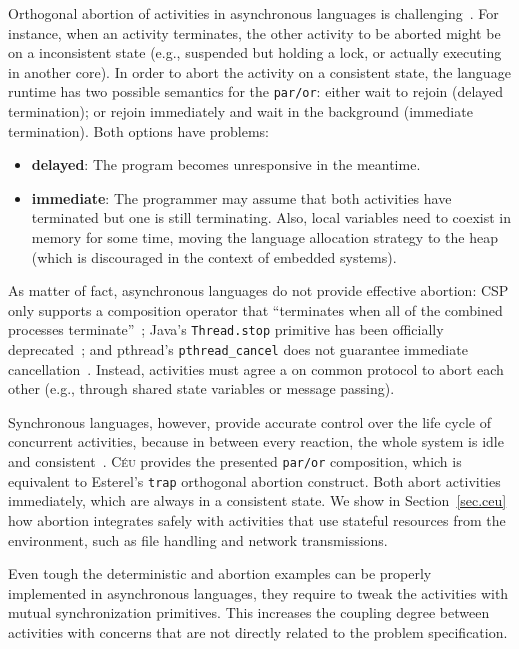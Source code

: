 \documentclass{acm_proc_article-sp}
\newcommand{\CEU}{\textsc{C\'{e}u}\xspace}
\newcommand{\code}[1] {{\small{\texttt{#1}}}}
\newcommand{\1}{\;}
\newcommand{\2}{\;\;}
\newcommand{\3}{\;\;\;}
\newcommand{\5}{\;\;\;\;\;}
\begin{document}
Orthogonal abortion of activities in asynchronous languages is 
challenging~\cite{esterel.preemption}.
%
For instance, when an activity terminates, the other activity to be aborted 
might be on a inconsistent state (e.g., suspended but holding a lock, or 
actually executing in another core).
%
In order to abort the activity on a consistent state, the language runtime has 
two possible semantics for the \code{par/or}:
either wait to rejoin (delayed termination);
or rejoin immediately and wait in the background (immediate termination).
Both options have problems:
\begin{itemize}
\item \textbf{delayed}:
    The program becomes unresponsive in the meantime.
\item \textbf{immediate}:
    The programmer may assume that both activities have terminated but one is 
still terminating.
    Also, local variables need to coexist in memory for some time, moving the 
    language allocation strategy to the heap (which is discouraged in the 
context of embedded systems).
\end{itemize}

As matter of fact, asynchronous languages do not provide effective abortion:
CSP only supports a composition operator that ``terminates when all of the 
combined processes terminate''~\cite{async.csp};
Java's \code{Thread.stop} primitive has been officially 
deprecated~\cite{sync_async.threadsstop};
and pthread's \code{pthread\_cancel} does not guarantee immediate 
cancellation~\cite{sync_async.pthreadsstop}.
%
Instead, activities must agree a on common protocol to abort each other (e.g., 
through shared state variables or message passing).

Synchronous languages, however, provide accurate control over the life cycle of 
concurrent activities, because in between every reaction, the whole system is 
idle and consistent~\cite{esterel.preemption}.
%
\CEU provides the presented \code{par/or} composition, which is equivalent to 
Esterel's \code{trap} orthogonal abortion construct.
Both abort activities immediately, which are always in a consistent state.
%
We show in Section~\ref{sec.ceu} how abortion integrates safely with activities 
that use stateful resources from the environment, such as file handling and 
network transmissions.


Even tough the deterministic and abortion examples can be properly implemented 
in asynchronous languages, they require to tweak the activities with mutual
synchronization primitives.
%
This increases the coupling degree between activities with concerns that are 
not directly related to the problem specification.
\end{document}
